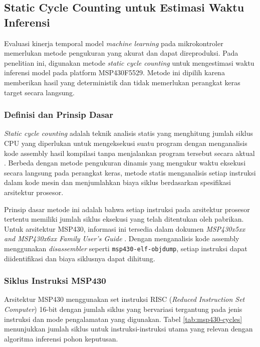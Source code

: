 
\subsection{Static Cycle Counting untuk Estimasi Waktu Inferensi}
\label{subsec:static-cycle-counting}

Evaluasi kinerja temporal model \textit{machine learning} pada mikrokontroler memerlukan metode pengukuran yang akurat dan dapat direproduksi. Pada penelitian ini, digunakan metode \textit{static cycle counting} untuk mengestimasi waktu inferensi model pada platform MSP430F5529. Metode ini dipilih karena memberikan hasil yang deterministik dan tidak memerlukan perangkat keras target secara langsung.

\subsubsection{Definisi dan Prinsip Dasar}

\textit{Static cycle counting} adalah teknik analisis statis yang menghitung jumlah siklus CPU yang diperlukan untuk mengeksekusi suatu program dengan menganalisis kode assembly hasil kompilasi tanpa menjalankan program tersebut secara aktual \cite{wilhelm2008wcet}. Berbeda dengan metode pengukuran dinamis yang mengukur waktu eksekusi secara langsung pada perangkat keras, metode statis menganalisis setiap instruksi dalam kode mesin dan menjumlahkan biaya siklus berdasarkan spesifikasi arsitektur prosesor.

Prinsip dasar metode ini adalah bahwa setiap instruksi pada arsitektur prosesor tertentu memiliki jumlah siklus eksekusi yang telah ditentukan oleh pabrikan. Untuk arsitektur MSP430, informasi ini tersedia dalam dokumen \textit{MSP430x5xx and MSP430x6xx Family User's Guide} \cite{ti2018msp430}. Dengan menganalisis kode assembly menggunakan \textit{disassembler} seperti \texttt{msp430-elf-objdump}, setiap instruksi dapat diidentifikasi dan biaya siklusnya dapat dihitung.

\subsubsection{Siklus Instruksi MSP430}

Arsitektur MSP430 menggunakan set instruksi RISC (\textit{Reduced Instruction Set Computer}) 16-bit dengan jumlah siklus yang bervariasi tergantung pada jenis instruksi dan mode pengalamatan yang digunakan. Tabel \ref{tab:msp430-cycles} menunjukkan jumlah siklus untuk instruksi-instruksi utama yang relevan dengan algoritma inferensi pohon keputusan.

